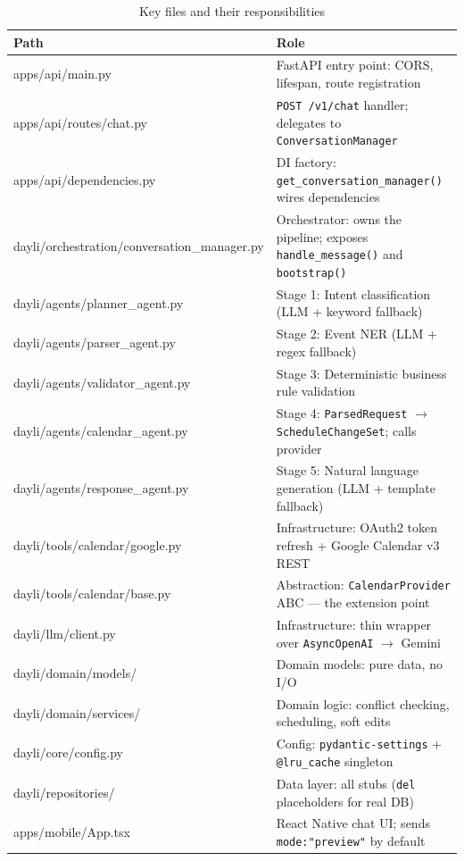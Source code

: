\documentclass[12pt, a4paper]{article}
\begin{document}
\begin{table}[htbp]
\centering
\small
\renewcommand{\arraystretch}{1.3}
\begin{tabularx}{\textwidth}{>{\ttfamily\raggedright\arraybackslash}p{5.8cm} X}
\toprule
\normalfont\textbf{Path} & \textbf{Role} \\
\midrule
apps/api/main.py
  & FastAPI entry point: CORS, lifespan, route registration \\
apps/api/routes/chat.py
  & \texttt{POST /v1/chat} handler; delegates to \texttt{ConversationManager} \\
apps/api/dependencies.py
  & DI factory: \texttt{get\_conversation\_}\allowbreak\texttt{manager()} wires dependencies \\
dayli/orchestration/\allowbreak conversation\_manager.py
  & Orchestrator: owns the pipeline; exposes \texttt{handle\_message()} and \texttt{bootstrap()} \\
dayli/agents/planner\_\allowbreak agent.py
  & Stage 1: Intent classification (LLM + keyword fallback) \\
dayli/agents/parser\_\allowbreak agent.py
  & Stage 2: Event NER (LLM + regex fallback) \\
dayli/agents/validator\_\allowbreak agent.py
  & Stage 3: Deterministic business rule validation \\
dayli/agents/calendar\_\allowbreak agent.py
  & Stage 4: \texttt{ParsedRequest} $\to$ \texttt{ScheduleChangeSet}; calls provider \\
dayli/agents/response\_\allowbreak agent.py
  & Stage 5: Natural language generation (LLM + template fallback) \\
dayli/tools/calendar/\allowbreak google.py
  & Infrastructure: OAuth2 token refresh + Google Calendar v3 REST \\
dayli/tools/calendar/base.py
  & Abstraction: \texttt{CalendarProvider} ABC --- the extension point \\
dayli/llm/client.py
  & Infrastructure: thin wrapper over \texttt{AsyncOpenAI} $\to$ Gemini \\
dayli/domain/models/
  & Domain models: pure data, no I/O \\
dayli/domain/services/
  & Domain logic: conflict checking, scheduling, soft edits \\
dayli/core/config.py
  & Config: \texttt{pydantic-settings} + \texttt{@lru\_cache} singleton \\
dayli/repositories/
  & Data layer: all stubs (\texttt{del} placeholders for real DB) \\
apps/mobile/App.tsx
  & React Native chat UI; sends \texttt{mode:"preview"} by default \\
\bottomrule
\end{tabularx}
\caption{Key files and their responsibilities}
\end{table}
\end{document}
